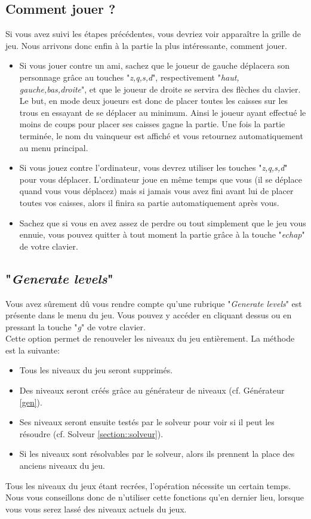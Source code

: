 \documentclass[a4paper,12pt]{article}
\begin{document}
\subsection{Comment jouer ?}
Si vous avez suivi les étapes précédentes, vous devriez voir apparaître la grille de jeu. Nous arrivons donc enfin à la partie la plus intéressante, comment jouer.
\begin{itemize}
\item Si vous jouer contre un ami, sachez que le joueur de gauche déplacera son personnage grâce au touches "\textit{z,q,s,d}", respectivement "\textit{haut, gauche,bas,droite}", et que le joueur de droite se servira des flèches du clavier. Le but, en mode deux joueurs est donc de placer toutes les caisses sur les trous en essayant de se déplacer au minimum. Ainsi le joueur ayant effectué le moins de coups pour placer ses caisses gagne la partie. Une fois la partie terminée, le nom du vainqueur est affiché et vous retournez automatiquement au menu principal.
\item Si vous jouez contre l'ordinateur, vous devrez utiliser les touches "\textit{z,q,s,d}" pour vous déplacer. L'ordinateur joue en même temps que vous (il se déplace quand vous vous déplacez) mais si jamais vous avez fini avant lui de placer toutes vos caisses, alors il finira sa partie automatiquement après vous.\\
\item Sachez que si vous en avez assez de perdre ou tout simplement que le jeu vous ennuie, vous pouvez quitter à tout moment la partie grâce à la touche "\textit{echap}" de votre clavier.
\end{itemize}
\subsection{"\textit{Generate levels}"}
Vous avez sûrement dû vous rendre compte qu'une rubrique "\textit{Generate levels}" est présente dans le menu du jeu. Vous pouvez y accéder en cliquant dessus ou en pressant la touche "\textit{g}" de votre clavier.\\
Cette option permet de renouveler les niveaux du jeu entièrement. La méthode est la suivante:
\begin{itemize}
    \item Tous les niveaux du jeu seront supprimés.
    \item Des niveaux seront créés grâce au générateur de niveaux (cf. Générateur \ref{gen}).
    \item Ses niveaux seront ensuite testés par le solveur pour voir si il peut les résoudre (cf. Solveur \ref{section::solveur}).
    \item Si les niveaux sont résolvables par le solveur, alors ils prennent la place des anciens niveaux du jeu.
\end{itemize}
Tous les niveaux du jeux étant recrées, l'opération nécessite un certain temps. Nous vous conseillons donc de n'utiliser cette fonctions qu'en dernier lieu, lorsque vous vous serez lassé des niveaux actuels du jeux.
\end{document}
